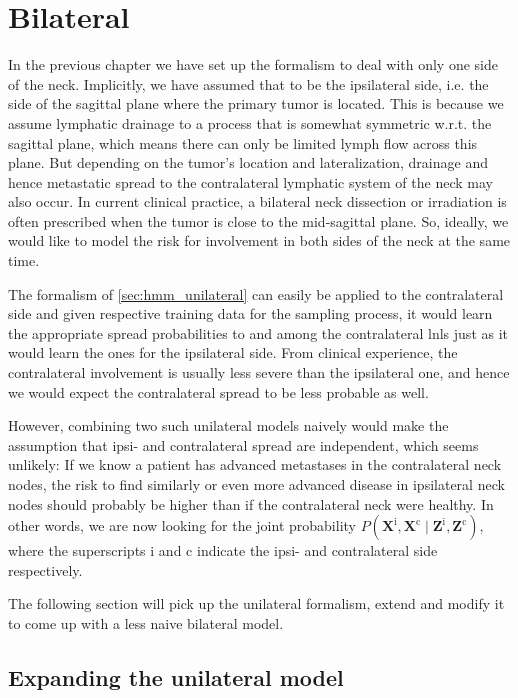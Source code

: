 \documentclass[\relativeRoot/main.tex]{subfiles}
\begin{document}
\section{Bilateral}
\label{sec:hmm:bilateral}

In the previous chapter we have set up the formalism to deal with only one side of the neck. Implicitly, we have assumed that to be the ipsilateral side, i.e. the side of the sagittal plane where the primary tumor is located. This is because we assume lymphatic drainage to a process that is somewhat symmetric w.r.t. the sagittal plane, which means there can only be limited lymph flow across this plane. But depending on the tumor's location and lateralization, drainage and hence metastatic spread to the contralateral lymphatic system of the neck may also occur. In current clinical practice, a bilateral neck dissection or irradiation is often prescribed when the tumor is close to the mid-sagittal plane. So, ideally, we would like to model the risk for involvement in both sides of the neck at the same time.

The formalism of \cref{sec:hmm_unilateral} can easily be applied to the contralateral side and given respective training data for the sampling process, it would learn the appropriate spread probabilities to and among the contralateral \glspl{lnl} just as it would learn the ones for the ipsilateral side. From clinical experience, the contralateral involvement is usually less severe than the ipsilateral one, and hence we would expect the contralateral spread to be less probable as well. 

However, combining two such unilateral models naively would make the assumption that ipsi- and contralateral spread are independent, which seems unlikely: If we know a patient has advanced metastases in the contralateral neck nodes, the risk to find similarly or even more advanced disease in ipsilateral neck nodes should probably be higher than if the contralateral neck were healthy. In other words, we are now looking for the joint probability $P \left( \mathbf{X}^\text{i}, \mathbf{X}^\text{c} \mid \mathbf{Z}^\text{i}, \mathbf{Z}^\text{c} \right)$, where the superscripts $\text{i}$ and $\text{c}$ indicate the ipsi- and contralateral side respectively.

The following section will pick up the unilateral formalism, extend and modify it to come up with a less naive bilateral model.

\subsection{Expanding the unilateral model}
\label{subsec:hmm:bilateral:expand}
\end{document}
